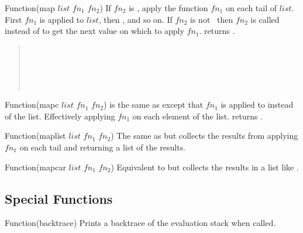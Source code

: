 \begin{defun}{Function}{(map $list$ $fn_{1}$ $fn_{2}$)}
  If $fn_{2}$ is \NIL, apply the function $fn_{1}$ on each tail of
  $list$. First $fn_{1}$ is applied to $list$, then ,
  and so on. If $fn_{2}$ is not \NIL\ then $fn_{2}$ is called instead
  of  to get the next value on which to apply $fn_{1}$.
   returns \NIL.

  \begin{quote}
    \\
    \\
    \\
    \\
    \NIL
  \end{quote}

\end{defun}

\begin{defun}{Function}{(mapc $list$ $fn_{1}$ $fn_{2}$)}
   is the same as  except that $fn_{1}$ is
  applied to  instead of the list. Effectively
  applying $fn_{1}$ on each element of the list.  returns
  \NIL.
\end{defun}


\begin{defun}{Function}{(maplist $list$ $fn_{1}$ $fn_{2}$)}
  The same as  but collects the results from applying
  $fn_{1}$ on each tail and returning a list of the results.

\end{defun}

\begin{defun}{Function}{(mapcar $list$ $fn_{1}$ $fn_{2}$)}
  Equivalent to  but collects the results in a list like
  .

\end{defun}

\subsection{Special Functions}

\begin{defun}{Function}{(backtrace)}
  Prints a backtrace of the evaluation stack when called.
\end{defun}

